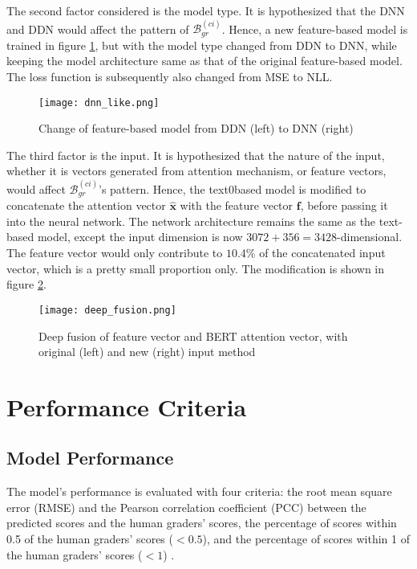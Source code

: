The second factor considered is the model type. It is hypothesized that the DNN and DDN would affect the pattern of $\mathcal{B}^{(ci)}_{gr}$. Hence, a new feature-based model is trained in figure \ref{fig:dnn_like}, but with the model type changed from DDN to DNN, while keeping the model architecture same as that of the original feature-based model. The loss function is subsequently also changed from MSE to NLL.

\begin{figure}[H]
    \centering
    \texttt{[image: dnn\_like.png]}
    \caption{Change of feature-based model from DDN (left) to DNN (right)}
    \label{fig:dnn_like}
\end{figure}

The third factor is the input. It is hypothesized that the nature of the input, whether it is vectors generated from attention mechanism, or feature vectors, would affect $\mathcal{B}^{(ci)}_{gr}$'s pattern. Hence, the text0based model is modified to concatenate the attention vector $\mathbf{\hat{x}}$ with the feature vector $\mathbf{f}$, before passing it into the neural network. The network architecture remains the same as the text-based model, except the input dimension is now $3072 + 356 = 3428$-dimensional. The feature vector would only contribute to $10.4\%$ of the concatenated input vector, which is a pretty small proportion only. The modification is shown in figure \ref{fig:deep_fusion}.

\begin{figure}[H]
    \centering
    \texttt{[image: deep\_fusion.png]}
    \caption{Deep fusion of feature vector and BERT attention vector, with original (left) and new (right) input method}
    \label{fig:deep_fusion}
\end{figure}

\section{Performance Criteria} \label{sec:performance_criteria}
\subsection{Model Performance}
The model's performance is evaluated with four criteria: the root mean square error (RMSE) and the Pearson correlation coefficient (PCC)  between the predicted scores and the human graders' scores, the percentage of scores within 0.5 of the human graders' scores ($< 0.5$),   and the percentage of scores within 1 of the human graders' scores ($< 1$) .


